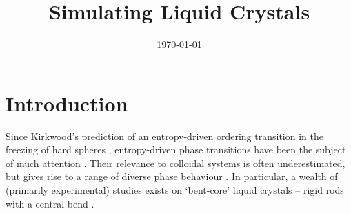 \documentclass[11pt, a4paper]{article} %
\title{Simulating Liquid Crystals}
\author{\authorstyle{Candidate 8277T} 
	\institution{Supervisors: Prof Erika Eiser, Mr Jiaming Yu}}
\date{\today} %
\begin{document}
	





\tableofcontents %
\newpage





\section{Introduction}

Since Kirkwood's prediction of an entropy-driven ordering transition in the freezing of hard spheres \cite{Kirkwood1954}, entropy-driven phase transitions have been the subject of much attention \cite{Kerr1993,Frenkel1999}. Their relevance to colloidal systems is often underestimated, but gives rise to a range of diverse phase behaviour \cite{Adams1998, Anderson2002, Forsyth1978}. In particular, a wealth of (primarily experimental) studies exists on `bent-core' liquid crystals -- rigid rods with a central bend \cite{Takezoe2006, Etxebarria2008, Yang2018}.
\end{document}
